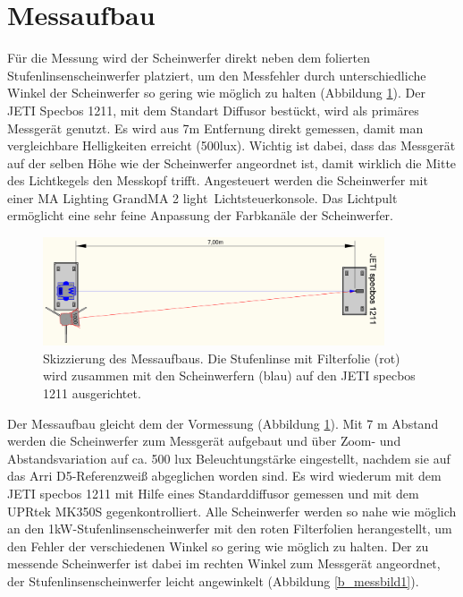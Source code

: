 \section{Messaufbau}
\label{sec_vmaum}

Für die Messung wird der Scheinwerfer direkt neben dem folierten Stufenlinsenscheinwerfer platziert, um den Messfehler durch unterschiedliche Winkel der Scheinwerfer so gering wie möglich zu halten (Abbildung \ref{b_aufbaumessung1}). Der JETI Specbos 1211, mit dem Standart Diffusor bestückt, wird als primäres Messgerät genutzt. Es wird aus 7m Entfernung direkt gemessen, damit man vergleichbare Helligkeiten erreicht (500lux). Wichtig ist dabei, dass das Messgerät auf der selben Höhe wie der Scheinwerfer angeordnet ist, damit wirklich die Mitte des Lichtkegels den Messkopf trifft.
Angesteuert werden die Scheinwerfer mit einer MA Lighting \glqq GrandMA 2 light\grqq\ Lichtsteuerkonsole. Das Lichtpult ermöglicht eine sehr feine Anpassung der Farbkanäle der Scheinwerfer.

\begin{figure}[H]     %
\centering
\includegraphics[width=0.9\textwidth]{bilder/aufbaumessung1} 
\caption {Skizzierung des Messaufbaus. Die Stufenlinse mit Filterfolie (rot) wird zusammen mit den Scheinwerfern (blau) auf den JETI specbos 1211 ausgerichtet.}\label{b_aufbaumessung1}
\end{figure}



Der Messaufbau gleicht dem der Vormessung (Abbildung \ref{b_aufbaumessung1}). Mit 7 m Abstand werden die Scheinwerfer zum Messgerät aufgebaut und über Zoom- und Abstandsvariation auf ca. 500 lux Beleuchtungstärke eingestellt, nachdem sie auf das Arri D5-Referenzweiß abgeglichen worden sind. Es wird wiederum mit dem JETI specbos 1211 mit Hilfe eines Standarddiffusor gemessen und mit dem UPRtek MK350S gegenkontrolliert. Alle Scheinwerfer werden so nahe wie möglich an den 1kW-Stufenlinsenscheinwerfer mit den roten Filterfolien herangestellt, um den Fehler der verschiedenen Winkel so gering wie möglich zu halten. Der zu messende Scheinwerfer ist dabei im rechten Winkel zum Messgerät angeordnet, der Stufenlinsenscheinwerfer leicht angewinkelt (Abbildung \ref{b_messbild1}).

